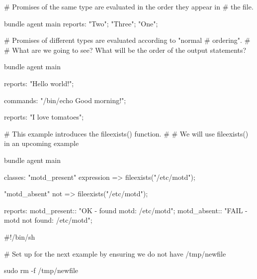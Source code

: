 \begin{codelisting}
\begin{code}
# Promises of the same type are evaluated in the order they appear in
# the file.

bundle agent main
{
  reports:
      "Two";
      "Three";
      "One";
}
\end{code}
\end{codelisting}
\begin{codelisting}
\begin{code}
# Promises of different types are evaluated according to "normal
# ordering".
#
# What are we going to see? What will be the order of the output statements?

bundle agent main
{
  reports:
      "Hello world!";

  commands:
      "/bin/echo Good morning!";

  reports:
      "I love tomatoes";
}
\end{code}
\end{codelisting}
\begin{codelisting}
\begin{code}
# This example introduces the fileexists() function.
#
# We will use fileexists() in an upcoming example

bundle agent main
{
  classes:
      "motd_present"
        expression => fileexists("/etc/motd");

      "motd_absent"
        not => fileexists("/etc/motd");

  reports:
      motd_present::  "OK - found motd: /etc/motd";
      motd_absent::   "FAIL - motd not found: /etc/motd";
}
\end{code}
\end{codelisting}
\begin{codelisting}
\begin{code}
#!/bin/sh

# Set up for the next example by ensuring we do not have /tmp/newfile

sudo rm -f /tmp/newfile
\end{code}
\end{codelisting}
